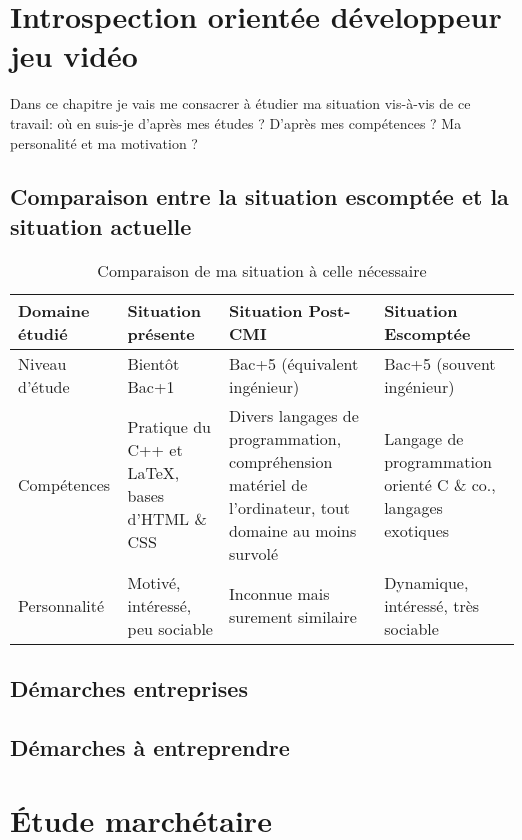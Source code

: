 \documentclass[12pt, a4paper]{report} %
\begin{document}
\chapter{Introspection orientée développeur jeu vidéo}
Dans ce chapitre je vais me consacrer à étudier ma situation vis-à-vis de ce travail: où en suis-je d'après mes études ? D'après mes compétences ? Ma personalité et ma motivation ? 
\section[Comparaison]{Comparaison entre la situation escomptée et la situation actuelle}
\begin{table}[h]
\begin{tabular}{|l|l|l|l|}
\hline
Domaine étudié & Situation présente & Situation Post-CMI & Situation Escomptée \\ \hline
Niveau d'étude & Bientôt Bac+1 & Bac+5 (équivalent ingénieur) & Bac+5 (souvent ingénieur) \\
Compétences & Pratique du C++ et \LaTeX{}, bases d'HTML \&{} CSS & Divers langages de programmation, compréhension matériel de l'ordinateur, tout domaine au moins survolé & Langage de programmation orienté C \&{} co., langages exotiques \\
Personnalité & Motivé, intéressé, peu sociable & Inconnue mais surement similaire & Dynamique, intéressé, très sociable \\


\end{tabular}
\caption{Comparaison de ma situation à celle nécessaire}
\label{tab::comp}
\end{table}


\section{Démarches entreprises}
\section{Démarches à entreprendre}





\newpage
\appendix
\chapter{Étude marchétaire}
\label{appendix}


\renewcommand{\bibname}{Sitographie}

\printglossary[title=List of Terms,toctitle=Termes et abréviations]
\label{glos}
\tableofcontents %
\end{document}
